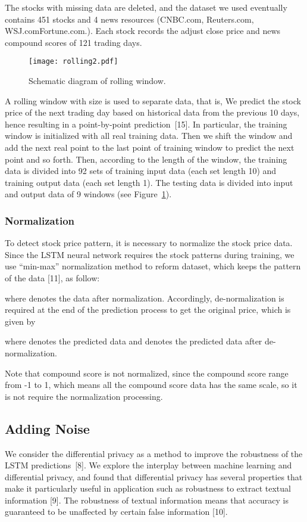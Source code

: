\documentclass{article}
\begin{document}
 The stocks with missing data are deleted, and the dataset we used eventually contains 451 stocks and 4 news resources (CNBC.com, Reuters.com, WSJ.comFortune.com.). Each stock records the adjust close price and news compound scores of 121 trading days.


\begin{figure}[!h]
	\centering
	\texttt{[image: rolling2.pdf]}
	\caption{Schematic diagram of rolling window.}
	\label{figure:rolling}
\end{figure}


A rolling window with size  is used to separate data, that is, We predict the stock price of the next trading day based on historical data from the previous 10 days, hence resulting in a point-by-point prediction~[15]. In particular, the training window is initialized with all real training data. Then we shift the window and add the next real point to the last point of training window to predict the next point and so forth. Then, according to the length of the window, the training data is divided into 92 sets of training input data (each set length 10) and training output data (each set length 1). The testing data is divided into input and output data of 9 windows (see Figure~\ref{figure:rolling}).


\subsubsection{Normalization}

To detect stock price pattern, it is necessary to normalize the stock price data. Since the LSTM neural network requires the stock patterns during training, we use ``min-max'' normalization method to reform dataset, which keeps the pattern of the data [11], as follow:

where  denotes the data after normalization. Accordingly, de-normalization is required at the end of the prediction process to get the original price, which is given by

where  denotes the predicted data and  denotes the predicted data after de-normalization.

Note that compound score is not normalized, since the compound score range from -1 to 1, which means all the compound score data has the same scale, so it is not require the normalization processing.



\subsection{Adding Noise}
We consider the differential privacy as a method to improve the robustness of the LSTM predictions~[8]. We explore the interplay between machine learning and differential privacy, and found that differential privacy has several properties that make it particularly useful in application such as robustness to extract textual information [9]. The robustness of textual information means that accuracy is guaranteed to be unaffected by certain false information [10].
\end{document}
